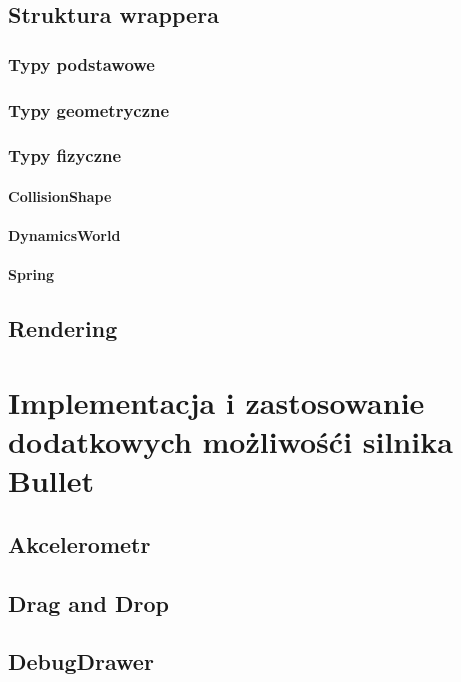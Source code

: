 \subsection{Struktura wrappera}

\subsubsection{Typy podstawowe}

\subsubsection{Typy geometryczne}

\subsubsection{Typy fizyczne}

\paragraph{CollisionShape}

\paragraph{DynamicsWorld}

\paragraph{Spring}

\subsection{Rendering}

\newpage
\section{Implementacja i zastosowanie dodatkowych możliwośći silnika Bullet}

\subsection{Akcelerometr}

\subsection{Drag and Drop}

\subsection{DebugDrawer}

